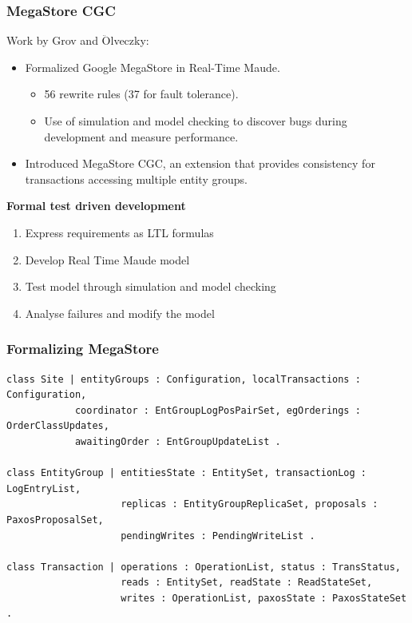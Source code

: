 \documentclass{beamer}
\begin{document}
\begin{frame}
    \frametitle{MegaStore CGC}
    \small
    Work by  Grov and $\ddot{\text{O}}$lveczky:
    \begin{itemize}
        \item Formalized Google MegaStore in Real-Time Maude.
        \begin{itemize}
            \item 56 rewrite rules (37 for fault tolerance).
            \item Use  of simulation and model checking to discover bugs during development and measure performance.
        \end{itemize} 
        \item Introduced MegaStore CGC, an extension that provides consistency for transactions 
        accessing multiple entity groups. 
    \end{itemize} 
    
    \bigskip
    \begin{center}
    \textbf{Formal test driven development}
        \begin{enumerate}
            \item Express requirements as LTL formulas
            \item Develop Real Time Maude model 
            \item Test model through simulation and model checking 
            \item Analyse failures and modify the model
        \end{enumerate}
    \end{center}
\end{frame}
\begin{frame}[fragile]   

    \frametitle{Formalizing MegaStore} 
    \scriptsize   
    \begin{lstlisting}[language=maude]
class Site | entityGroups : Configuration, localTransactions : Configuration,
            coordinator : EntGroupLogPosPairSet, egOrderings : OrderClassUpdates,
            awaitingOrder : EntGroupUpdateList .

class EntityGroup | entitiesState : EntitySet, transactionLog : LogEntryList,
                    replicas : EntityGroupReplicaSet, proposals : PaxosProposalSet,
                    pendingWrites : PendingWriteList .

class Transaction | operations : OperationList, status : TransStatus,
                    reads : EntitySet, readState : ReadStateSet,
                    writes : OperationList, paxosState : PaxosStateSet .
    \end{lstlisting}
\end{frame}
\end{document}
